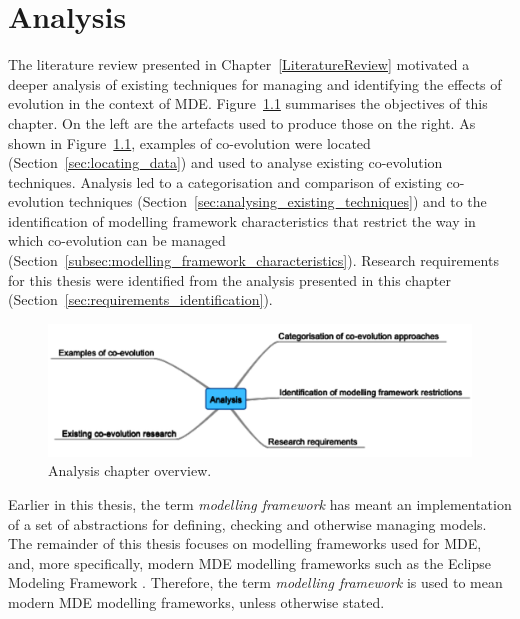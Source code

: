
\chapter{Analysis}
\label{Analysis}
The literature review presented in Chapter~\ref{LiteratureReview} motivated a deeper analysis of existing techniques for managing and identifying the effects of evolution in the context of MDE. Figure~\ref{fig:analysis_overview} summarises the objectives of this chapter. On the left are the artefacts used to produce those on the right. As shown in Figure~\ref{fig:analysis_overview}, examples of co-evolution were located (Section~\ref{sec:locating_data}) and used to analyse existing co-evolution techniques. Analysis led to a categorisation and comparison of existing co-evolution techniques (Section~\ref{sec:analysing_existing_techniques}) and to the identification of modelling framework characteristics that restrict the way in which co-evolution can be managed (Section~\ref{subsec:modelling_framework_characteristics}). Research requirements for this thesis were identified from the analysis presented in this chapter (Section~\ref{sec:requirements_identification}).


\begin{figure}[htbp]
  \begin{center}
    \leavevmode
    \includegraphics[scale=0.66]{4.Analysis/overview.pdf}
  \end{center}
  \caption{Analysis chapter overview.}
  \label{fig:analysis_overview}
\end{figure}

Earlier in this thesis, the term \emph{modelling framework} has meant an implementation of a set of abstractions for defining, checking and otherwise managing models. The remainder of this thesis focuses on modelling frameworks used for MDE, and, more specifically, modern MDE modelling frameworks such as the Eclipse Modeling Framework \cite{steinberg09emf}. Therefore, the term \emph{modelling framework} is used to mean modern MDE modelling frameworks, unless otherwise stated.


